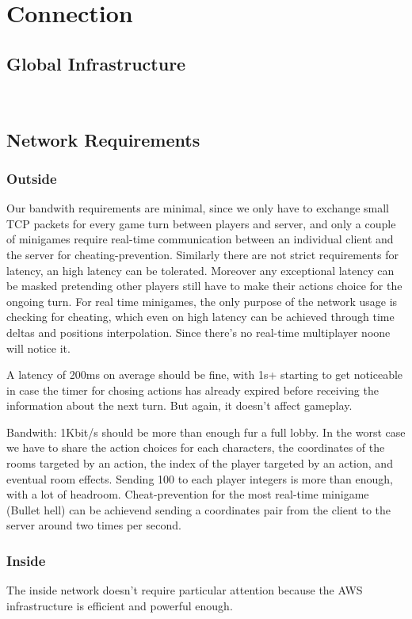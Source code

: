 \section{Connection}
\subsection{Global Infrastructure}
  ~\\
\pagebreak 
\subsection{Network Requirements}

\subsubsection{Outside}
Our bandwith requirements are minimal, since we only have to exchange small TCP packets for every game turn between players and server, and only a couple of minigames require real-time communication between an individual client and the server for cheating-prevention.
Similarly there are not strict requirements for latency, an high latency can be tolerated. Moreover any exceptional latency can be masked pretending other players still have to make their actions choice for the ongoing turn. For real time minigames, the only purpose of the network usage is checking for cheating, which even on high latency can be achieved through time deltas and positions interpolation. Since there's no real-time multiplayer noone will notice it.

A latency of 200ms on average should be fine, with 1s+ starting to get noticeable in case the timer for chosing actions has already expired before receiving the information about the next turn. But again, it doesn't affect gameplay.

Bandwith: 1Kbit/s should be more than enough fur a full lobby. In the worst case we have to share the action choices for each characters, the coordinates of the rooms targeted by an action, the index of the player targeted by an action, and eventual room effects. Sending 100 to each player integers is more than enough, with a lot of headroom. Cheat-prevention for the most real-time minigame (Bullet hell) can be achievend sending a coordinates pair from the client to the server around two times per second.


\subsubsection{Inside}
The inside network doesn’t require particular attention because the AWS infrastructure is efficient and powerful enough.

